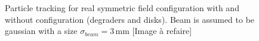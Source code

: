 \begin{figure}[!h]
	\begin{center}
		
	\end{center}
	\caption[Particle tracking for real symmetric field configuration with and without configuration]{Particle tracking for real symmetric field configuration with and without configuration (degraders and disks). Beam is assumed to be gaussian with a size $\sigma_{beam}=3\,\mathrm{mm}$ [Image à refaire]}
	\label{chap3:SymTransversalProfile}
\end{figure}
